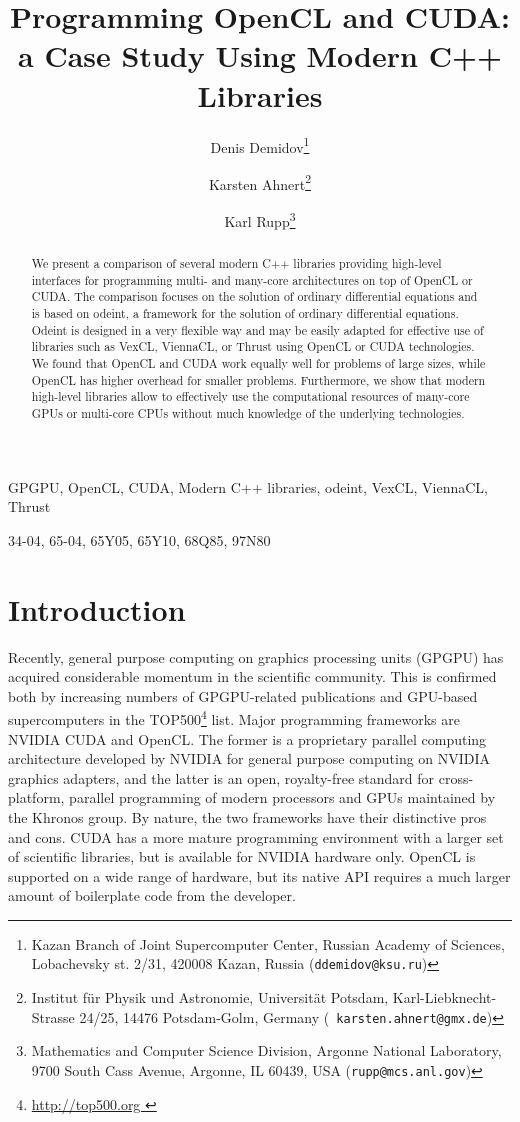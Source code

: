 \documentclass[final]{siamltex}
\title{Programming OpenCL and CUDA:\\a Case Study Using Modern C++ Libraries}
\author{
Denis Demidov\thanks{
Kazan Branch of Joint Supercomputer Center,
Russian Academy of Sciences,
Lobachevsky st. 2/31, 420008 Kazan, Russia
({\tt ddemidov@ksu.ru}) }
\and Karsten Ahnert\thanks{Institut f\"ur Physik und Astronomie, Universit\"at Potsdam,
Karl-Liebknecht-Strasse 24/25, 14476 Potsdam-Golm, Germany ({\tt
karsten.ahnert@gmx.de}) }
\and Karl Rupp\thanks{Mathematics and Computer Science Division,
Argonne National Laboratory,
9700 South Cass Avenue, Argonne, IL 60439, USA
({\tt rupp@mcs.anl.gov}) } }
\begin{document}
\maketitle

\begin{abstract}
    We present a comparison of several modern C++ libraries providing high-level interfaces
    for programming multi- and many-core architectures on top of OpenCL or CUDA.
    The comparison focuses on the solution of ordinary differential equations and is based on odeint,
    a framework for the solution of ordinary differential equations. Odeint is designed in a
    very flexible way and may be easily adapted for effective use of libraries such
    as VexCL, ViennaCL, or Thrust using OpenCL or CUDA technologies.
    We found that OpenCL and CUDA work equally well for problems
    of large sizes, while OpenCL has higher overhead for smaller problems.
    Furthermore, we show that modern high-level libraries allow to effectively
    use the computational resources of many-core GPUs or multi-core CPUs without much
    knowledge of the underlying technologies.
\end{abstract}

\begin{keywords}
    GPGPU, OpenCL, CUDA, Modern C++ libraries, odeint, VexCL, ViennaCL, Thrust
\end{keywords}

\begin{AMS}
    34-04, 65-04, 65Y05, 65Y10, 68Q85, 97N80
\end{AMS}


%
%
\section{Introduction}

\pagestyle{myheadings}

\thispagestyle{plain}


Recently, general purpose computing on graphics processing units (GPGPU) has
acquired considerable momentum in the scientific community. This is confirmed
both by increasing numbers of GPGPU-related publications and GPU-based
supercomputers in the TOP500\footnote{ \href{ http://top500.org }{
http://top500.org }} list. Major programming frameworks are NVIDIA CUDA and
OpenCL.  The former is a proprietary parallel computing architecture developed
by NVIDIA for general purpose computing on NVIDIA graphics adapters, and the
latter is an open, royalty-free standard for cross-platform, parallel
programming of modern processors and GPUs maintained by the Khronos group. By
nature, the two frameworks have their distinctive pros and cons. CUDA has a
more mature programming environment with a larger set of scientific libraries,
but is available for NVIDIA hardware only. OpenCL is supported on a wide range
of hardware, but its native API requires a much larger amount of boilerplate
code from the developer.
\end{document}
